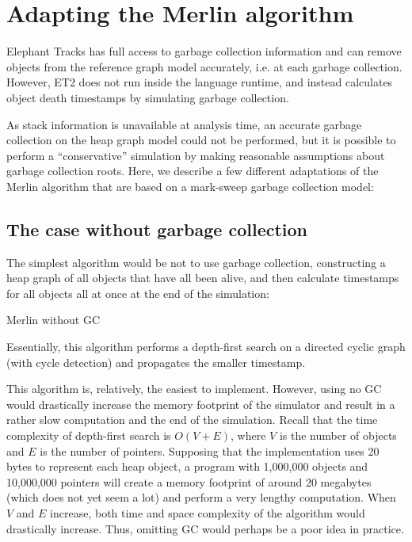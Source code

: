 \section{Adapting the Merlin algorithm}
Elephant Tracks has full access to garbage collection information and can remove objects from the reference graph model accurately, i.e. at each garbage
collection. However, ET2 does not run inside the language runtime, and instead calculates object death timestamps by simulating garbage collection.

As stack information is unavailable at analysis time, an accurate garbage collection on the heap graph model could not be performed, but it is possible
to perform a ``conservative'' simulation by making reasonable assumptions about garbage collection roots. Here, we describe a few different adaptations
of the Merlin algorithm that are based on a mark-sweep garbage collection model:

\subsection{The case without garbage collection}
The simplest algorithm would be not to use garbage collection, constructing a heap graph of all objects that have all been alive, and then calculate timestamps
for all objects all at once at the end of the simulation:

\begin{algorithm}[H]
  \caption{Merlin without GC}
\end{algorithm}

Essentially, this algorithm performs a depth-first search on a directed cyclic graph (with cycle detection) and propagates the smaller timestamp.

This algorithm is, relatively, the easiest to implement. However, using no GC would drastically increase the memory footprint of the simulator and result in
a rather slow computation and the end of the simulation. Recall that the time complexity of depth-first search is $O(V + E)$, where $V$ is the number of
objects and $E$ is the number of pointers. Supposing that the implementation uses 20 bytes to represent each heap object, a program with 1,000,000 objects
and 10,000,000 pointers will create a memory footprint of around 20 megabytes (which does not yet seem a lot) and perform a very lengthy computation. When
$V$ and $E$ increase, both time and space complexity of the algorithm would drastically increase. Thus, omitting GC would perhaps be a poor idea in practice.

